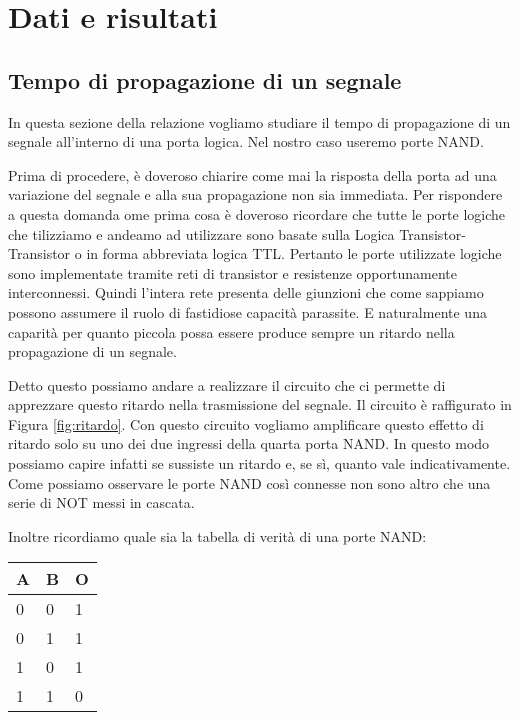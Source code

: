 \section*{Dati e risultati}

\subsection*{Tempo di propagazione di un segnale}

In questa sezione della relazione vogliamo studiare il tempo di propagazione di un segnale all'interno di una porta logica. Nel nostro caso useremo porte NAND.

Prima di procedere, è doveroso chiarire come mai la risposta della porta ad una variazione del segnale e alla sua propagazione non sia immediata.
Per rispondere a questa domanda ome prima cosa è doveroso ricordare che tutte le porte logiche che tilizziamo e andeamo ad utilizzare sono basate sulla Logica Transistor-Transistor o in forma abbreviata logica TTL. Pertanto le porte utilizzate logiche sono implementate tramite reti di transistor e resistenze opportunamente interconnessi. Quindi l'intera rete presenta delle giunzioni che come sappiamo possono assumere il ruolo di fastidiose capacità parassite. E naturalmente una caparità per quanto piccola possa essere produce sempre un ritardo nella propagazione di un segnale.

Detto questo possiamo andare a realizzare il circuito che ci permette di apprezzare questo ritardo nella trasmissione del segnale. Il circuito è raffigurato in Figura \ref{fig:ritardo}. Con questo circuito vogliamo amplificare questo effetto di ritardo solo su uno dei due ingressi della quarta porta NAND. In questo modo possiamo capire infatti se sussiste un ritardo e, se sì, quanto vale indicativamente. Come possiamo osservare le porte NAND così connesse non sono altro che una serie di NOT messi in cascata.

Inoltre ricordiamo quale sia la tabella di verità di una porte NAND:

\begin{center}
	\begin{tabular}{lll}
	\toprule
		A & B & O\\
	\midrule
		0 & 0 & 1 \\
		0 & 1 & 1 \\
		1 & 0 & 1 \\
		1 & 1 & 0 \\
	\bottomrule
	\end{tabular}
\end{center}

